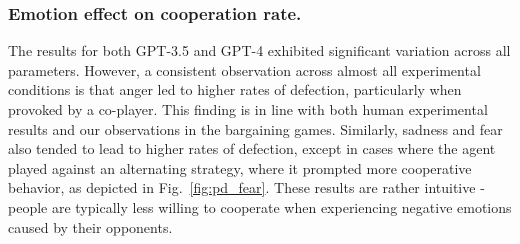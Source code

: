 \documentclass{article}
\begin{document}



\subsubsection{Emotion effect on cooperation rate.} The results for both GPT-3.5 and GPT-4 exhibited significant variation across all parameters. However, a consistent observation across almost all experimental conditions is that anger led to higher rates of defection, particularly when provoked by a co-player. This finding is in line with both human experimental results and our observations in the bargaining games. Similarly, sadness and fear also tended to lead to higher rates of defection, except in cases where the agent played against an alternating strategy, where it prompted more cooperative behavior, as depicted in Fig.~\ref{fig:pd_fear}. These results are rather intuitive - people are typically less willing to cooperate when experiencing negative emotions caused by their opponents. 

\end{document}
